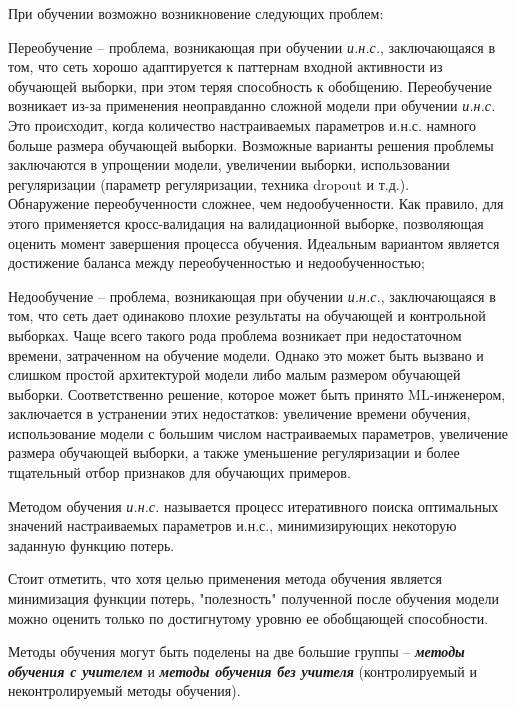 При обучении возможно возникновение следующих проблем:

\begin{textitemize}
	\item Переобучение -- проблема, возникающая при обучении  \textit{и.н.с.}, заключающаяся в том,
	что сеть хорошо адаптируется к паттернам входной активности из обучающей выборки, при этом теряя способность к обобщению.
	Переобучение возникает из-за применения неоправданно сложной модели при обучении  \textit{и.н.с.} Это происходит,
	когда количество настраиваемых параметров и.н.с. намного больше размера обучающей выборки. Возможные
	варианты решения проблемы заключаются в упрощении модели, увеличении выборки, использовании регуляризации
	(параметр регуляризации, техника dropout и т.д.).\\
	Обнаружение переобученности сложнее, чем недообученности. Как правило, для этого применяется
	кросс-валидация на валидационной выборке, позволяющая оценить момент завершения процесса обучения.
	Идеальным вариантом является достижение баланса между переобученностью и недообученностью;

	\item Недообучение -- проблема, возникающая при обучении  \textit{и.н.с.}, заключающаяся в том,
	что сеть дает одинаково плохие результаты на обучающей и контрольной выборках.
	Чаще всего такого рода проблема возникает при недостаточном времени, затраченном на обучение модели.
	Однако это может быть вызвано и слишком простой архитектурой модели либо малым размером обучающей
	выборки. Соответственно решение, которое может быть принято ML-инженером, заключается в устранении
	этих недостатков: увеличение времени обучения, использование модели с большим числом настраиваемых
	параметров, увеличение размера обучающей выборки, а также уменьшение регуляризации и более тщательный
	отбор признаков для обучающих примеров.
\end{textitemize}

Методом обучения \textit{и.н.с.} называется процесс итеративного поиска оптимальных значений настраиваемых параметров и.н.с., минимизирующих некоторую заданную функцию потерь.

Стоит отметить, что хотя целью применения метода обучения является минимизация функции потерь, "полезность"{} полученной после обучения модели можно оценить только по достигнутому уровню ее обобщающей способности.

Методы обучения могут быть поделены на две большие группы -- \textit{\textbf{методы обучения с учителем}} и \textit{\textbf{методы обучения без учителя}} (контролируемый и неконтролируемый методы обучения).

